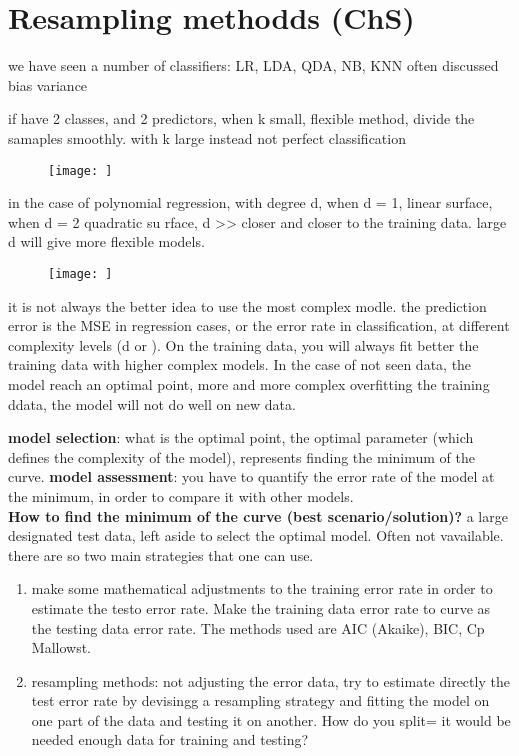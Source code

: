 \chapter{Resampling methodds (ChS)}
we have seen a number of classifiers: LR, LDA, QDA, NB, KNN
often discussed bias variance 

if have 2 classes, and 2 predictors, when k small, flexible method, divide the samaples smoothly. with k large instead not perfect classification

\begin{figure}[h]
\caption{}
\centering
\texttt{[image: ]}
\label{}
\end{figure}


in the case of polynomial regression, with degree d, when d = 1, linear surface, when d = 2 quadratic su rface, d >> closer and closer to the training data. large d will give more flexible models. 

\begin{figure}[h]
\caption{}
\centering
\texttt{[image: ]}
\label{}
\end{figure}

it is not always the better idea to use the most complex modle. the prediction error is the MSE in regression cases, or the error rate in classification, at different complexity levels (d or ). On the training data, you will always fit better the training data with higher complex models. In the case of not seen data, the model reach an optimal point, more and more complex overfitting the training ddata, the model will not do well on new data. 

\textbf{model selection}: what is the optimal point, the optimal parameter (which defines the complexity of the model), represents finding the minimum of the curve. 
\textbf{model assessment}: you have to quantify the error rate of the model at the minimum, in order to compare it with other models.\\


\textbf{How to find the minimum of the curve (best scenario/solution)?} a large designated test data, left aside to select the optimal model. Often not vavailable. there are so two main strategies that one can use.

\begin{enumerate}
	\item make some mathematical adjustments to the training error rate in order to estimate the testo error rate. Make the training data error rate to curve as the testing data error rate. The methods used are AIC (Akaike), BIC, Cp Mallowst.
	\item resampling methods: not adjusting the error data, try to estimate directly the test error rate by devisingg a resampling strategy and fitting the model on one part of the data and testing it on another. How do you split= it would be needed enough data for training and testing?
\end{enumerate}

